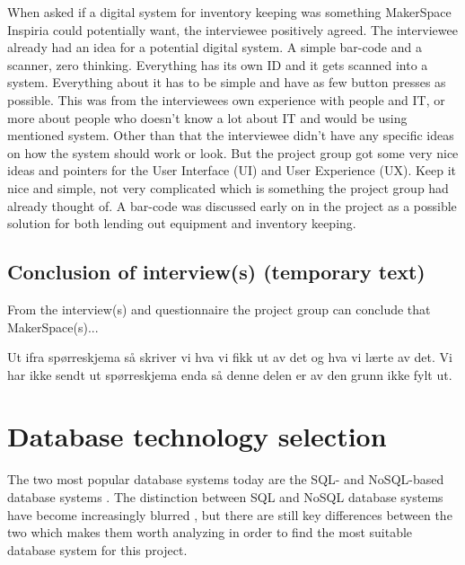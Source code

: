 When asked if a digital system for inventory keeping was something MakerSpace Inspiria could potentially want, the interviewee positively agreed. The interviewee already had an idea for a potential digital system. A simple bar-code and a scanner, zero thinking. Everything has its own ID and it gets scanned into a system. Everything about it has to be simple and have as few button presses as possible. This was from the interviewees own experience with people and IT, or more about people who doesn't know a lot about IT and would be using mentioned system. Other than that the interviewee didn't have any specific ideas on how the system should work or look. But the project group got some very nice ideas and pointers for the User Interface (UI) and User Experience (UX). Keep it nice and simple, not very complicated which is something the project group had already thought of. A bar-code was discussed early on in the project as a possible solution for both lending out equipment and inventory keeping. 

\subsection{Conclusion of interview(s) (temporary text)}

From the interview(s) and questionnaire the project group can conclude that MakerSpace(s)... 

Ut ifra spørreskjema så skriver vi hva vi fikk ut av det og hva vi lærte av det. Vi har ikke sendt ut spørreskjema enda så denne delen er av den grunn ikke fylt ut.

\section{Database technology selection}
The two most popular database systems today are the SQL- and NoSQL-based database systems \cite{stackoverflow-db-statistics}.
The distinction between SQL and NoSQL database systems have become increasingly blurred \cite{sql-vs-nosql}, but there are still key differences between the two which makes them worth analyzing in order to find the most suitable database system for this project.

\iffalse
